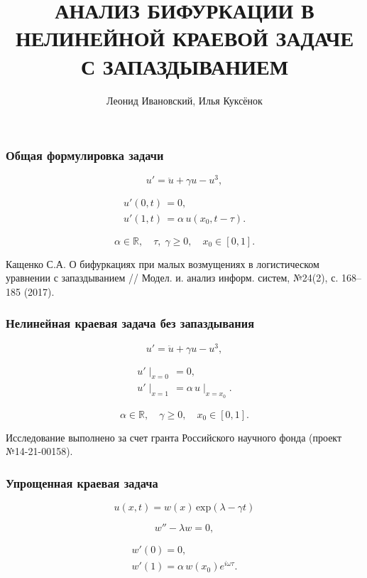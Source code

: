 \documentclass[fullscreen=true, unicode, bookmarks=false]{beamer}
\title[]{ АНАЛИЗ БИФУРКАЦИИ В НЕЛИНЕЙНОЙ КРАЕВОЙ ЗАДАЧЕ С ЗАПАЗДЫВАНИЕМ }
\author[]{{\large Леонид Ивановский, Илья Куксёнок}}
\date{}
\institute[]
{  }
\begin{document}
\begin{frame}
\titlepage
\end{frame} 

\begin{frame}
\frametitle{ Общая формулировка задачи }
 
\begin{equation}\label{eq1}
	u' = \ddot{u} + \gamma u - u^3,
\end{equation}	

\begin{gather}\label{eq2}	
	u'(0, t) \, = 0, \\
	u'(1, t) \, = \alpha\,u(x_0, t-\tau). \nonumber
\end{gather}

$$ \alpha \in \mathbb{R}, \quad \tau, \; \gamma \geqslant 0, \quad x_0 \in [0, 1]. $$

\medskip
\pause

\begin{exampleblock}{}
{\large Кащенко С.А. О бифуркациях при малых возмущениях в логистическом уравнении с запаздыванием // Модел. и. анализ информ. систем, №24(2), с. 168--185 (2017). }
\end{exampleblock}

\end{frame}

\begin{frame}
\frametitle{ Нелинейная краевая задача без запаздывания}
 
\begin{equation}\label{eq3}
	u' = \ddot{u} + \gamma u - u^3,
\end{equation}	

\begin{gather}\label{eq4}	
	u'\mid_{x=0} \, = 0, \\
	u'\mid_{x=1} \, = \alpha\,u\mid_{x=x_0}. \nonumber
\end{gather}

$$ \alpha \in \mathbb{R}, \quad \gamma \geqslant 0, \quad x_0 \in [0, 1]. $$

\medskip

\begin{exampleblock}{}
{\large Исследование выполнено за счет гранта Российского научного фонда (проект №14-21-00158). }
\end{exampleblock}

\end{frame}

\begin{frame}
\frametitle{ Упрощенная краевая задача }

$$ u(x, t) = w(x)\,\mbox{exp}\left( \lambda - \gamma t \right) $$

\bigskip
\pause
	
\begin{equation}\label{eq5}
	w'' - \lambda w = 0,
\end{equation}

\begin{gather}\label{eq6}	
	w'(0) = 0, \\
	w'(1) = \alpha\,w(x_0)e^{i \omega \tau}. \nonumber
\end{gather}

\end{frame}
\end{document}
